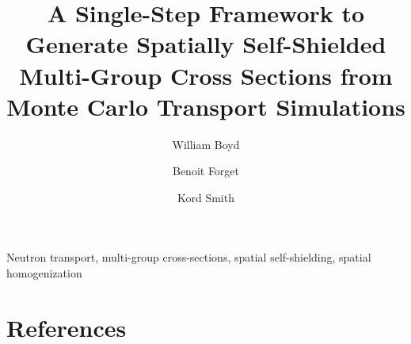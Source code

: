 \documentclass[authoryear,5p]{elsarticle}
\begin{document}
\begin{frontmatter}

\title{A Single-Step Framework to Generate Spatially Self-Shielded Multi-Group Cross Sections from Monte Carlo Transport Simulations}

\author[MITRE]{William Boyd\footnotemark{}}

\author[MIT]{Benoit Forget\corref{}}

\author[MIT]{Kord Smith\corref{}}

\address[MITRE]{MITRE Corporation, 7525 Colshire Drive, McLean, Virginia 22102, United States}
\address[MIT]{Massachusetts Institute of Technology, Department of Nuclear Science and Engineering, 77 Massachusetts Avenue, Building 24, Cambridge, MA 02139, United States}


\begin{abstract}

\end{abstract}

\begin{keyword}
Neutron transport, multi-group cross-sections, spatial self-shielding, spatial homogenization
\end{keyword}

\end{frontmatter}

\setcounter{footnote}{1}










\section*{References}


\end{document}
